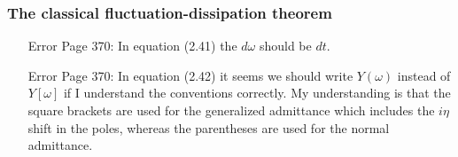 \subsubsection{The classical fluctuation-dissipation theorem}

\begin{itemize}

\item[Error] Page 370: In equation (2.41) the $d\omega$ should be $dt$.

\item[Error] Page 370: In equation (2.42) it seems we should write $Y(\omega)$ instead of $Y[\omega]$ if I understand the conventions correctly. My understanding is that the square brackets are used for the generalized admittance which includes the $i\eta$ shift in the poles, whereas the parentheses are used for the normal admittance.

\end{itemize}
